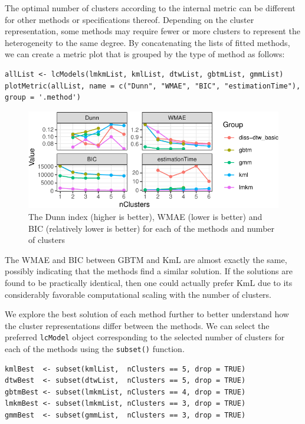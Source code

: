 The optimal number of clusters according to the internal metric can be different for other methods or specifications thereof. Depending on the cluster representation, some methods may require fewer or more clusters to represent the heterogeneity to the same degree. By concatenating the lists of fitted methods, we can create a metric plot that is grouped by the type of method as follows:

\begin{verbatim}
allList <- lcModels(lmkmList, kmlList, dtwList, gbtmList, gmmList)
plotMetric(allList, name = c("Dunn", "WMAE", "BIC", "estimationTime"), group = '.method')
\end{verbatim}

\begin{figure}

{\centering \includegraphics{figures/numclus-1} 

}

\caption{The Dunn index (higher is better), WMAE (lower is better) and BIC (relatively lower is better) for each of the methods and number of clusters}\label{fig:numclus}
\end{figure}

The WMAE and BIC between GBTM and KmL are almost exactly the same, possibly indicating that the methods find a similar solution. If the solutions are found to be practically identical, then one could actually prefer KmL due to its considerably favorable computational scaling with the number of clusters.

We explore the best solution of each method further to better understand how the cluster representations differ between the methods. We can select the preferred \texttt{lcModel} object corresponding to the selected number of clusters for each of the methods using the \texttt{subset()} function.

\begin{verbatim}
kmlBest  <- subset(kmlList,  nClusters == 5, drop = TRUE)
dtwBest  <- subset(dtwList,  nClusters == 5, drop = TRUE)
gbtmBest <- subset(lmkmList, nClusters == 4, drop = TRUE)
lmkmBest <- subset(lmkmList, nClusters == 3, drop = TRUE)
gmmBest  <- subset(gmmList,  nClusters == 3, drop = TRUE)
\end{verbatim}

